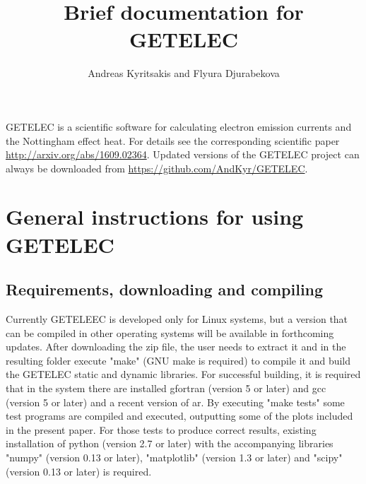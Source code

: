 \documentclass[notitlepage]{revtex4-1}
\begin{document}
\title{Brief documentation for GETELEC}

\author{Andreas Kyritsakis and Flyura Djurabekova}


\maketitle

GETELEC is a scientific software for calculating electron emission currents and the Nottingham effect heat. For details see the corresponding scientific paper \url{http://arxiv.org/abs/1609.02364}. Updated versions of the GETELEC project can always be downloaded from \url{https://github.com/AndKyr/GETELEC}.

\section{General instructions for using GETELEC}
\label{sec:Gen}

\subsection{Requirements, downloading and compiling}

Currently GETELEEC is developed only for Linux systems, but a version that can be compiled in other operating systems will be available in forthcoming updates. After downloading the zip file, the user needs to extract it and in the resulting folder execute "make" (GNU make is required) to compile it and build the GETELEC static and dynamic libraries. For successful building, it is required that in the system there are installed gfortran (version 5 or later) and gcc (version 5 or later) and a recent version of ar. By executing "make tests" some test programs are compiled and executed, outputting some of the plots included in the present paper. For those tests to produce correct results, existing installation of python (version 2.7 or later) with the accompanying libraries "numpy" (version 0.13 or later), "matplotlib" (version 1.3 or later) and "scipy" (version 0.13 or later) is required.
\end{document}
